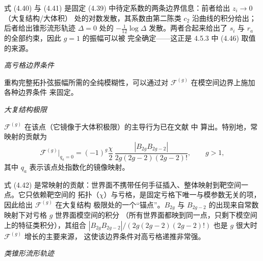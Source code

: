 \begin{yizhu}[物理图像]
式 (4.40) 与 (4.41) 是固定 (4.39) 中待定系数的两条边界信息：前者给出 $z_i\to0$（大复结构/大体积）
处的对数发散，其系数由第二陈类 $c_2$ 沿曲线的积分给出；后者给出锥形流形轨迹 $\Delta=0$ 处的
$-\frac{1}{12}\log\Delta$ 发散。两者合起来给出了 $s_i$ 与 $r_a$ 的全部约束，因此 $g=1$ 的振幅可以被
完全确定——这正是 4.5.3 中 (4.46) 取值的来源。
\end{yizhu}

\medskip
\noindent\emph{高亏格边界条件}\par

重构完整拓扑弦振幅所需的全纯模糊性，可以通过对 $\mathcal{F}^{(g)}$ 在模空间边界上施加各种边界条件
来固定。

\medskip
\noindent\emph{大复结构极限}\par

$\mathcal{F}^{(g)}$ 在该点（它镜像于大体积极限）的主导行为已在文献 \cite{ref18,ref19,ref83,ref13,ref84,ref14} 中
算出。特别地，常映射的贡献为
\begin{equation}\tag{4.42}
\mathcal{F}^{(g)}\big|_{q_a=0}
= (-1)^g\frac{\chi}{2}\,
  \frac{|B_{2g}B_{2g-2}|}{2g(2g-2)(2g-2)!},
\qquad g>1,
\end{equation}
其中 $q_a$ 表示该点处指数化的镜像映射。

\begin{yizhu}[物理图像]
式 (4.42) 是常映射的贡献：世界面不携带任何手征插入、整体映射到靶空间一点。它只依赖靶空间的
拓扑（$\chi$）与亏格，是固定亏格下唯一与模参数无关的项，因此给出 $\mathcal{F}^{(g)}$ 在大复结构
极限处的一个“锚点”。$B_{2g}$ 与 $B_{2g-2}$ 的出现来自常数映射下对亏格 $g$ 世界面模空间的积分
（所有世界面都映到同一点，只剩下模空间上的特征类积分），其组合
$|B_{2g}B_{2g-2}|/\left(2g(2g-2)(2g-2)!\right)$ 也是 $g$ 很大时 $\mathcal{F}^{(g)}$ 增长的主要来源，
这使该边界条件对高亏格递推非常强。
\end{yizhu}

\medskip
\noindent\emph{类锥形流形轨迹}\par

